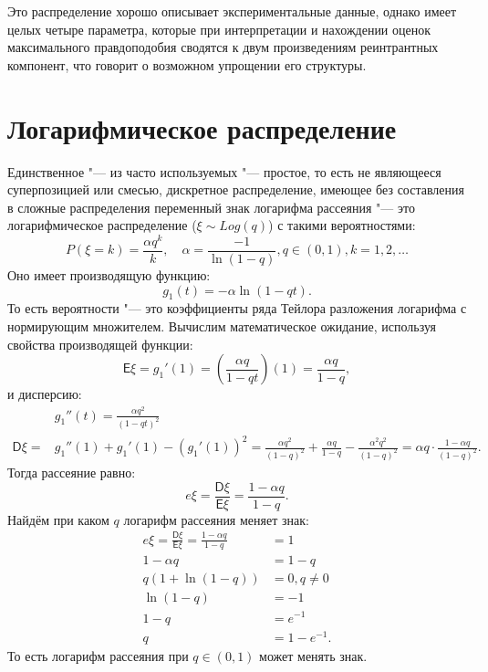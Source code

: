 \documentclass[12pt, specialist, subf, substylefile = spbu.rtx]{disser}
\begin{document}
	Это распределение хорошо описывает экспериментальные данные, однако имеет целых четыре параметра, которые при интерпретации и нахождении оценок максимального правдоподобия сводятся к двум произведениям реинтрантных компонент, что говорит о возможном упрощении его структуры.

	\section{Логарифмическое распределение}
	
	Единственное "--- из часто используемых "--- простое, то есть не являющееся суперпозицией или смесью, дискретное распределение, имеющее без составления в сложные распределения переменный знак логарифма рассеяния "--- это логарифмическое распределение ($ \xi \sim Log(q) $) с такими вероятностями:
	\[
		P(\xi = k) = \frac {\alpha q ^k} {k},\quad \alpha = \frac {-1} {\ln (1 - q)}, q \in (0, 1), k = 1, 2, \dots
	\]
	Оно имеет производящую функцию:
	\[
		g _1(t) = -\alpha \ln (1 - qt).
	\]
	То есть вероятности "--- это коэффициенты ряда Тейлора разложения логарифма с нормирующим множителем. Вычислим математическое ожидание, используя свойства производящей функции:
	\[
		\mathsf{E} \xi = g _1' (1) = \left( \frac {\alpha q} {1 - qt} \right) (1) = \frac {\alpha q} {1 - q}, 
	\]
	и дисперсию:
	\[
		\begin{aligned}
			&g _1'' (t) = \frac {\alpha q ^2} {(1 - qt) ^2}\\
			\mathsf{D} \xi = &g _1''(1) + g _1'(1) - \left( g _1' (1) \right) ^2 = \frac {\alpha q ^2} {(1 - q) ^2} + \frac {\alpha q} {1 - q} - \frac {\alpha ^2 q ^2} {(1 - q) ^2} = \alpha q \cdot \frac {1 - \alpha q} {(1 - q) ^2}.
		\end{aligned}
	\]
	Тогда рассеяние равно:
	\[
		e\xi = \frac {\mathsf{D} \xi} {\mathsf{E} \xi} = \frac {1 - \alpha q} {1 - q}.
	\]
	Найдём при каком $ q $ логарифм рассеяния меняет знак:
	\[
		\begin{aligned}
			e\xi = \frac {\mathsf{D} \xi} {\mathsf{E} \xi} = \frac {1 - \alpha q} {1 - q} &= 1\\
			1 - \alpha q &= 1 - q\\
			q (1 + \ln (1 - q)) &= 0, q \not = 0\\
			\ln (1 - q) &= -1\\
			1 - q &= e ^{-1}\\
			q &= 1 - e ^{-1}.
		\end{aligned}
	\]
	То есть логарифм рассеяния при $ q \in (0, 1) $ может менять знак.
	
\end{document}
